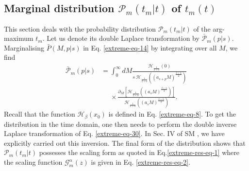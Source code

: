\documentclass[showpacs,amsmath,amssymb,aps,pre,twocolumn,]{revtex4-1}
\def\greenw#1{{\color{black} #1}}
\begin{document}
\subsection{Marginal distribution $\mathcal{P}_m \left( t_m|t \right)$ of $t_m(t)$}
\label{MargtM}
This section deals with the probability distribution $\mathcal{P}_m \left( t_m|t \right)$ of the arg-maximum $t_m$. Let us denote its double Laplace transformation by $\bar{\mathcal{P}}_m(p|s)$. Marginalising $\bar{P}(M, p|s)$ in Eq. \eqref{extreme-eq-14} by integrating over all $M$, we find
\begin{align}
\bar{\mathcal{P}}_m(p|s) &= \int _{0}^{\infty} dM \frac{  \mathcal{H}_{\frac{1}{2+\alpha}} \left(0 \right) }{s~\mathcal{H}_{\frac{1}{2+\alpha}} \left( (a_{s+p} M)^{\frac{2+\alpha}{2}} \right)}
\nonumber  \\
& ~~~~~~\times \frac{\partial _M \left[ \mathcal{H}_{\frac{1}{2+\alpha}} \left( (a_s M)^{\frac{2+\alpha}{2}} \right) \right]}{ \mathcal{H}_{\frac{1}{2+\alpha}} \left( (a_s M)^{\frac{2+\alpha}{2}} \right)}.
\label{extreme-eq-30}
\end{align}
Recall that the function $\mathcal{H}_{\beta}(x_0)$ is defined in Eq. \eqref{extreme-eq-8}.
\greenw{To get the distribution in the time domain, one then needs to perform the double inverse Laplace transformation of Eq. \eqref{extreme-eq-30}. In Sec. IV of SM \cite{Supplementary}, we have explicitly carried out this inversion.} The final form of the distribution shows that $\mathcal{P}_m \left( t_m|t \right)$ possesses the scaling form as quoted in Eq.\eqref{extreme-res-eq-1} where the scaling function $\mathcal{G}_m^{\alpha}(z)$ is given in Eq. \eqref{extreme-res-eq-2}.
\end{document}
